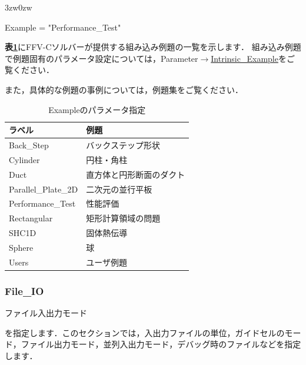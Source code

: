 \begin{indentation}{3zw}{0zw}

{\small
\begin{program}
  Example = "Performance_Test"
\end{program}
}

\textbf{表\ref{tbl:intrinsic_example}}にFFV-Cソルバーが提供する組み込み例題の一覧を示します．
組み込み例題で例題固有のパラメータ設定については，Parameter$\to$\hyperlink{tgt:intrinsic_example}{Intrinsic\_Example}をご覧ください．

また，具体的な例題の事例については，例題集をご覧ください．

\begin{table}[htdp]
\caption{Exampleのパラメータ指定}
\begin{center}
\small
\begin{tabular}{ll} \toprule
ラベル & 例題\\ \midrule
Back\_Step & バックステップ形状\\
Cylinder & 円柱・角柱\\
Duct & 直方体と円形断面のダクト\\
Parallel\_Plate\_2D & 二次元の並行平板\\
Performance\_Test & 性能評価\\
Rectangular & 矩形計算領域の問題\\
SHC1D & 固体熱伝導\\ 
Sphere & 球\\ 
Users & ユーザ例題\\ \bottomrule
\end{tabular}
\end{center}
\label{tbl:intrinsic_example}
\end{table}

\end{indentation}


\pagebreak
\subsubsection{File\_IO}

\hypertarget{tgt:fileio}{ファイル入出力モード}を指定します．このセクションでは，入出力ファイルの単位，ガイドセルのモード，ファイル出力モード，並列入出力モード，デバッグ時のファイルなどを指定します．

